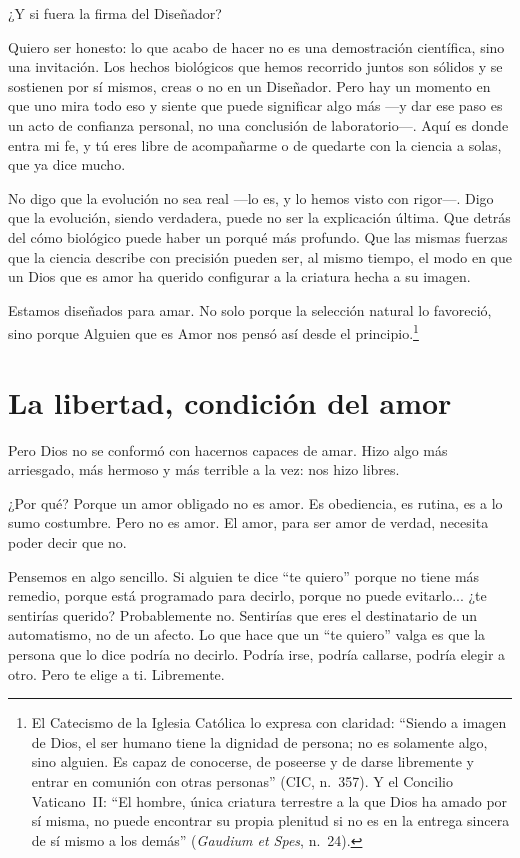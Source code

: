 ¿Y si fuera la firma del Diseñador?

Quiero ser honesto: lo que acabo de hacer no es una demostración científica, sino una invitación. Los hechos biológicos que hemos recorrido juntos son sólidos y se sostienen por sí mismos, creas o no en un Diseñador. Pero hay un momento en que uno mira todo eso y siente que puede significar algo más ---y dar ese paso es un acto de confianza personal, no una conclusión de laboratorio---. Aquí es donde entra mi fe, y tú eres libre de acompañarme o de quedarte con la ciencia a solas, que ya dice mucho.

No digo que la evolución no sea real ---lo es, y lo hemos visto con rigor---. Digo que la evolución, siendo verdadera, puede no ser la explicación última. Que detrás del cómo biológico puede haber un porqué más profundo. Que las mismas fuerzas que la ciencia describe con precisión pueden ser, al mismo tiempo, el modo en que un Dios que es amor ha querido configurar a la criatura hecha a su imagen.

Estamos diseñados para amar. No solo porque la selección natural lo favoreció, sino porque Alguien que es Amor nos pensó así desde el principio.\footnote{El Catecismo de la Iglesia Católica lo expresa con claridad: ``Siendo a imagen de Dios, el ser humano tiene la dignidad de persona; no es solamente algo, sino alguien. Es capaz de conocerse, de poseerse y de darse libremente y entrar en comunión con otras personas'' (CIC, n.~357). Y el Concilio Vaticano~II: ``El hombre, única criatura terrestre a la que Dios ha amado por sí misma, no puede encontrar su propia plenitud si no es en la entrega sincera de sí mismo a los demás'' (\textit{Gaudium et Spes}, n.~24).}

\section{La libertad, condición del amor}

Pero Dios no se conformó con hacernos capaces de amar. Hizo algo más arriesgado, más hermoso y más terrible a la vez: nos hizo libres.

¿Por qué? Porque un amor obligado no es amor. Es obediencia, es rutina, es a lo sumo costumbre. Pero no es amor. El amor, para ser amor de verdad, necesita poder decir que no.

Pensemos en algo sencillo. Si alguien te dice ``te quiero'' porque no tiene más remedio, porque está programado para decirlo, porque no puede evitarlo... ¿te sentirías querido? Probablemente no. Sentirías que eres el destinatario de un automatismo, no de un afecto. Lo que hace que un ``te quiero'' valga es que la persona que lo dice podría no decirlo. Podría irse, podría callarse, podría elegir a otro. Pero te elige a ti. Libremente.

